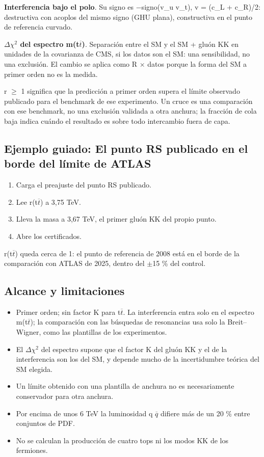 \documentclass[11pt,a4paper]{article}
\begin{document}
\textbf{Interferencia bajo el polo}. Su signo es \ensuremath{-}signo(v\_u v\_t), v = (c\_L + c\_R)/2: destructiva con acoplos del mismo signo (GHU plana), constructiva en el punto de referencia curvado.

\textbf{\ensuremath{\Delta}\ensuremath{\chi}\ensuremath{{}^{2}} del espectro m(t\ensuremath{\overline{t}})}. Separación entre el SM y el SM + gluón KK en unidades de la covarianza de CMS, si los datos son el SM: una sensibilidad, no una exclusión. El cambio se aplica como R \ensuremath{\times} datos porque la forma del SM a primer orden no es la medida.

r \ensuremath{\geq} 1 significa que la predicción a primer orden supera el límite observado publicado para el benchmark de ese experimento. Un cruce es una comparación con ese benchmark, no una exclusión validada a otra anchura; la fracción de cola baja indica cuándo el resultado es sobre todo intercambio fuera de capa.
\subsection*{Ejemplo guiado: El punto RS publicado en el borde del límite de ATLAS}
\begin{enumerate}
\item Carga el preajuste del punto RS publicado.
\item Lee r(t\ensuremath{\overline{t}}) a 3,75 TeV.
\item Lleva la masa a 3,67 TeV, el primer gluón KK del propio punto.
\item Abre los certificados.
\end{enumerate}
r(t\ensuremath{\overline{t}}) queda cerca de 1: el punto de referencia de 2008 está en el borde de la comparación con ATLAS de 2025, dentro del \ensuremath{\pm}15 \% del control.
\subsection*{Alcance y limitaciones}
\begin{itemize}
\item Primer orden; sin factor K para t\ensuremath{\overline{t}}. La interferencia entra solo en el espectro m(t\ensuremath{\overline{t}}); la comparación con las búsquedas de resonancias usa solo la Breit--Wigner, como las plantillas de los experimentos.
\item El \ensuremath{\Delta}\ensuremath{\chi}\ensuremath{{}^{2}} del espectro supone que el factor K del gluón KK y el de la interferencia son los del SM, y depende mucho de la incertidumbre teórica del SM elegida.
\item Un límite obtenido con una plantilla de anchura no es necesariamente conservador para otra anchura.
\item Por encima de unos 6 TeV la luminosidad q \ensuremath{\overline{q}} difiere más de un 20 \% entre conjuntos de PDF.
\item No se calculan la producción de cuatro tops ni los modos KK de los fermiones.
\end{itemize}
\end{document}
